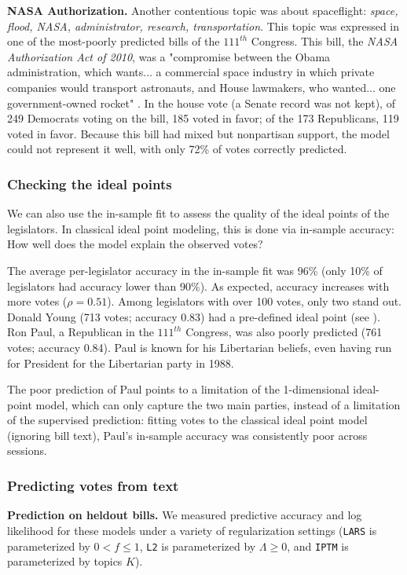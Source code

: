 \textbf{NASA Authorization.}
Another contentious topic was about spaceflight: \emph{space, flood,
NASA, administrator, research, transportation}.
This topic was expressed in one of the most-poorly predicted bills of
the $111^{th}$ Congress.  This bill, the \emph{NASA Authorization Act
of 2010}, was a "compromise between the Obama administration, which
wants... a commercial space industry in which private companies would
transport astronauts, and House lawmakers, who wanted... one
government-owned rocket" \cite{herszenhorn:2010}.  In the house vote
(a Senate record was not kept), of 249 Democrats voting on the bill,
185 voted in favor; of the 173 Republicans, 119 voted in favor.
Because this bill had mixed but nonpartisan support, the model could
not represent it well, with only 72\% of votes correctly predicted.

\subsubsection*{Checking the ideal points}
We can also use the in-sample fit to assess the quality of the ideal
points of the legislators.  In classical ideal point modeling, this is
done via in-sample accuracy: How well does the model explain the
observed votes?

The average per-legislator accuracy in the in-sample fit was 96\%
(only 10\% of legislators had accuracy lower than 90\%).  As expected,
accuracy increases with more votes ($\rho=0.51$).  Among legislators
with over 100 votes, only two stand out. Donald Young (713 votes;
accuracy 0.83) had a pre-defined ideal point (see ). Ron
Paul, a Republican in the $111^{th}$ Congress, was also poorly
predicted (761 votes; accuracy 0.84).  Paul is known for his
Libertarian beliefs, even having run for President for the Libertarian
party in 1988.

The poor prediction of Paul points to a limitation of the
1-dimensional ideal-point model, which can only capture the two main
parties, instead of a limitation of the supervised prediction: fitting
votes to the classical ideal point model (ignoring bill text), Paul's
in-sample accuracy was consistently poor across sessions.

\subsubsection*{Predicting votes from text}

\textbf{Prediction on heldout bills.}  We measured predictive accuracy
and log likelihood for these models under a variety of regularization
settings (\verb!LARS! is parameterized by $0 < f \le 1$, \verb!L2! is
parameterized by $\Lambda \ge 0$, and \verb!IPTM! is parameterized by
topics $K$).

